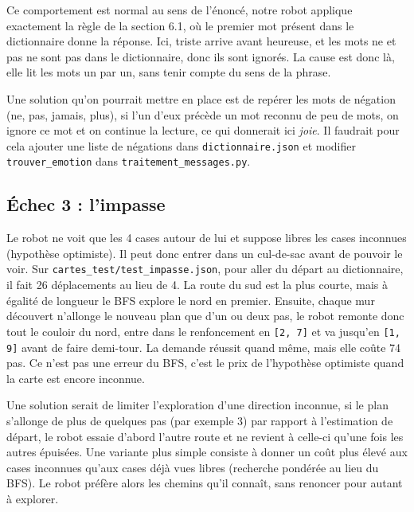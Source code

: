 \documentclass[11pt,a4paper]{article}
\begin{document}
Ce comportement est normal au sens de l'énoncé, notre robot applique exactement la règle de la
section 6.1, où le premier mot présent dans le dictionnaire donne la réponse. Ici, \og triste\fg{}
arrive avant \og heureuse\fg{}, et les mots \og ne\fg{} et \og pas\fg{} ne sont pas dans le
dictionnaire, donc ils sont ignorés. La cause est donc là, elle lit les mots un
par un, sans tenir compte du sens de la phrase.

Une solution qu'on pourrait mettre en place est de repérer les mots de négation (\og ne\fg{},
\og pas\fg{}, \og jamais\fg{}, \og plus\fg{}), si l'un d'eux précède un mot reconnu de peu de
mots, on ignore ce mot et on continue la lecture, ce qui donnerait ici \emph{joie}. Il faudrait
pour cela ajouter une liste de négations dans \texttt{dictionnaire.json} et modifier
\texttt{trouver\_emotion} dans \texttt{traitement\_messages.py}.

\subsection{Échec 3 : l'impasse}
Le robot ne voit que les 4 cases autour de lui et suppose libres les cases inconnues (hypothèse
optimiste). Il peut donc entrer dans un cul-de-sac avant de pouvoir le voir. Sur
\texttt{cartes\_test/test\_impasse.json}, pour aller du départ au dictionnaire, il fait 26
déplacements au lieu de 4. La route du sud est la plus courte, mais à égalité de longueur le BFS
explore le nord en premier. Ensuite, chaque mur découvert n'allonge le nouveau plan que d'un ou
deux pas, le robot remonte donc tout le couloir du nord, entre dans le renfoncement en
\texttt{[2, 7]} et va jusqu'en \texttt{[1, 9]} avant de faire demi-tour. La demande réussit quand
même, mais elle coûte 74 pas. Ce n'est pas une erreur du BFS, c'est le prix de l'hypothèse
optimiste quand la carte est encore inconnue.

Une solution serait de limiter l'exploration d'une direction inconnue, si le plan s'allonge de
plus de quelques pas (par exemple 3) par rapport à l'estimation de départ, le robot essaie
d'abord l'autre route et ne revient à celle-ci qu'une fois les autres épuisées. Une variante plus
simple consiste à donner un coût plus élevé aux cases inconnues qu'aux cases déjà vues libres
(recherche pondérée au lieu du BFS). Le robot préfère alors les chemins qu'il connaît, sans
renoncer pour autant à explorer.
\end{document}
